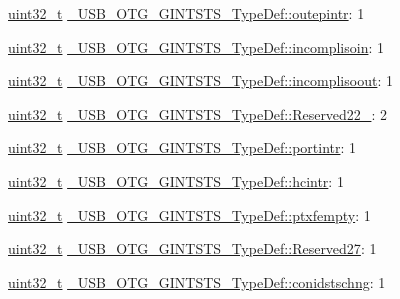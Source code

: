 \begin{DoxyCompactItemize}
\item 
\hyperlink{stdint_8h_a435d1572bf3f880d55459d9805097f62}{uint32\-\_\-t} \hyperlink{group___u_s_b___o_t_g___d_r_i_v_e_r_ga28a8418f5393bdaf76727ed9dfd7d80f}{\-\_\-\-U\-S\-B\-\_\-\-O\-T\-G\-\_\-\-G\-I\-N\-T\-S\-T\-S\-\_\-\-Type\-Def\-::outepintr}\-: 1
\item 
\hyperlink{stdint_8h_a435d1572bf3f880d55459d9805097f62}{uint32\-\_\-t} \hyperlink{group___u_s_b___o_t_g___d_r_i_v_e_r_gafb6b6a219e9b7ecd82a3e8223e7f4157}{\-\_\-\-U\-S\-B\-\_\-\-O\-T\-G\-\_\-\-G\-I\-N\-T\-S\-T\-S\-\_\-\-Type\-Def\-::incomplisoin}\-: 1
\item 
\hyperlink{stdint_8h_a435d1572bf3f880d55459d9805097f62}{uint32\-\_\-t} \hyperlink{group___u_s_b___o_t_g___d_r_i_v_e_r_gae03f82d550153902ee9e64cfdaa0544c}{\-\_\-\-U\-S\-B\-\_\-\-O\-T\-G\-\_\-\-G\-I\-N\-T\-S\-T\-S\-\_\-\-Type\-Def\-::incomplisoout}\-: 1
\item 
\hyperlink{stdint_8h_a435d1572bf3f880d55459d9805097f62}{uint32\-\_\-t} \hyperlink{group___u_s_b___o_t_g___d_r_i_v_e_r_gad5c8bf1efdc7397182de9f961b906fb6}{\-\_\-\-U\-S\-B\-\_\-\-O\-T\-G\-\_\-\-G\-I\-N\-T\-S\-T\-S\-\_\-\-Type\-Def\-::\-Reserved22\-\_}\-: 2
\item 
\hyperlink{stdint_8h_a435d1572bf3f880d55459d9805097f62}{uint32\-\_\-t} \hyperlink{group___u_s_b___o_t_g___d_r_i_v_e_r_ga892d7ace179d025cd937a411eca950d3}{\-\_\-\-U\-S\-B\-\_\-\-O\-T\-G\-\_\-\-G\-I\-N\-T\-S\-T\-S\-\_\-\-Type\-Def\-::portintr}\-: 1
\item 
\hyperlink{stdint_8h_a435d1572bf3f880d55459d9805097f62}{uint32\-\_\-t} \hyperlink{group___u_s_b___o_t_g___d_r_i_v_e_r_gaf650d15c5ad75174f2f207185162658b}{\-\_\-\-U\-S\-B\-\_\-\-O\-T\-G\-\_\-\-G\-I\-N\-T\-S\-T\-S\-\_\-\-Type\-Def\-::hcintr}\-: 1
\item 
\hyperlink{stdint_8h_a435d1572bf3f880d55459d9805097f62}{uint32\-\_\-t} \hyperlink{group___u_s_b___o_t_g___d_r_i_v_e_r_gad248f65c7426067defbfcfd1b8d41ece}{\-\_\-\-U\-S\-B\-\_\-\-O\-T\-G\-\_\-\-G\-I\-N\-T\-S\-T\-S\-\_\-\-Type\-Def\-::ptxfempty}\-: 1
\item 
\hyperlink{stdint_8h_a435d1572bf3f880d55459d9805097f62}{uint32\-\_\-t} \hyperlink{group___u_s_b___o_t_g___d_r_i_v_e_r_gab1be67d79cb4713aa7269a77ae5a68a6}{\-\_\-\-U\-S\-B\-\_\-\-O\-T\-G\-\_\-\-G\-I\-N\-T\-S\-T\-S\-\_\-\-Type\-Def\-::\-Reserved27}\-: 1
\item 
\hyperlink{stdint_8h_a435d1572bf3f880d55459d9805097f62}{uint32\-\_\-t} \hyperlink{group___u_s_b___o_t_g___d_r_i_v_e_r_ga3cccb37fe1af0f5b089d3f92a8eb36c0}{\-\_\-\-U\-S\-B\-\_\-\-O\-T\-G\-\_\-\-G\-I\-N\-T\-S\-T\-S\-\_\-\-Type\-Def\-::conidstschng}\-: 1

\end{DoxyCompactItemize}
